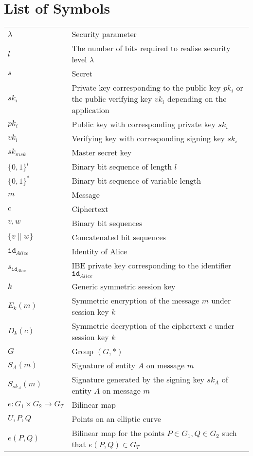 \documentclass[master=eelt,masteroption=em]{kulemt}
\theoremstyle{plain}
\theoremstyle{definition}
\newcommand{\id}[1]{\ensuremath{\mathtt{id}_{#1}}}
\begin{document}
\chapter{List of Symbols}
\begin{flushleft}
 \renewcommand{\arraystretch}{1.1}
 \begin{tabularx}{\textwidth}{@{}p{30mm}X@{}}
  $\lambda$ & Security parameter \\
  $l$ & The number of bits required to realise security level $\lambda$ \\
  $s$ & Secret \\
  $sk_i$ & Private key corresponding to the public key $pk_i$ or the public verifying key $vk_i$ depending on the application \\
  $pk_i$ & Public key with corresponding private key $sk_i$ \\
  $vk_i$ & Verifying key with corresponding signing key $sk_i$ \\
  $sk_{msk}$ & Master secret key \\
  $\{ 0,1 \}^l$ & Binary bit sequence of length $l$ \\
  $\{ 0,1 \}^*$ & Binary bit sequence of variable length \\
  $m$ & Message \\
  $c$ & Ciphertext \\
  $v, w$ & Binary bit sequences \\
  $\{ v \parallel w \}$ & Concatenated bit sequences \\
  \id{Alice} & Identity of Alice \\ 
  $s_{\id{Alice}}$ & IBE private key corresponding to the identifier \id{Alice} \\
  $k$ & Generic symmetric session key \\
  $E_k \left( m \right)$ & Symmetric encryption of the message $m$ under session key $k$ \\
  $D_k \left( c \right)$ & Symmetric decryption of the ciphertext $c$ under session key $k$ \\
  $G$ & Group $\left( G, * \right)$ \\
  $S_A \left( m \right)$ & Signature of entity $A$ on message $m$ \\
  $S_{sk_A} \left( m \right)$ & Signature generated by the signing key $sk_A$ of entity $A$ on message $m$ \\
  $e: G_1 \times G_2 \rightarrow G_T$ & Bilinear map \\
  $U, P, Q$ & Points on an elliptic curve \\
  $e \left( P, Q \right)$ & Bilinear map  for the points $P \in G_1, Q \in G_2$ such that ${e \left( P, Q \right) \in G_T}$ \\  
    \end{tabularx}
\end{flushleft}
\end{document}
